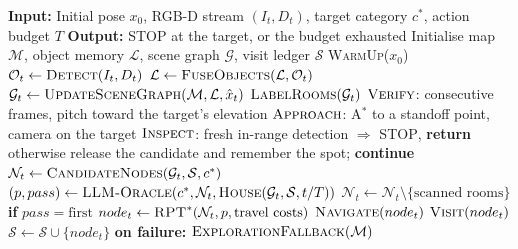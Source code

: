 \begin{algorithm}[htbp]
\caption{LLM-Guided Room Search with Target Closing}
\label{alg:exploration}
\begin{algorithmic}[1]
\STATE \textbf{Input:} Initial pose $x_0$, RGB-D stream $(I_t, D_t)$, target category $c^{*}$, action budget $T$
\STATE \textbf{Output:} \textsc{STOP} at the target, or the budget exhausted
\STATE Initialise map $\mathcal{M}$, object memory $\mathcal{L}$, scene graph $\mathcal{G}$, visit ledger $\mathcal{S}$
\STATE \textsc{WarmUp}($x_0$) 
    \STATE $\mathcal{O}_t \leftarrow \textsc{Detect}(I_t, D_t)$ 
    \STATE $\mathcal{L} \leftarrow \textsc{FuseObjects}(\mathcal{L}, \mathcal{O}_t)$ 
    \STATE $\mathcal{G}_t \leftarrow \textsc{UpdateSceneGraph}(\mathcal{M}, \mathcal{L}, \hat{x}_t)$ 
    \STATE $\textsc{LabelRooms}(\mathcal{G}_t)$ 
        \STATE $\textsc{Verify}$: consecutive frames, pitch toward the target's elevation
        \STATE $\textsc{Approach}$: A$^{*}$ to a standoff point, camera on the target
        \STATE $\textsc{Inspect}$: fresh in-range detection $\Rightarrow$ \textsc{STOP}, \textbf{return}
        \STATE otherwise release the candidate and remember the spot; \textbf{continue}
    \ENDIF
        \STATE $\mathcal{N}_t \leftarrow \textsc{CandidateNodes}(\mathcal{G}_t, \mathcal{S}, c^{*})$ 
        \STATE $(p, pass) \leftarrow \textsc{LLM-Oracle}(c^{*}, \mathcal{N}_t, \textsc{House}(\mathcal{G}_t, \mathcal{S}, t/T))$ 
        \STATE $\mathcal{N}_t \leftarrow \mathcal{N}_t \setminus \{\text{scanned rooms}\}$ \textbf{if} $pass = \text{first}$ 
        \STATE $node_t \leftarrow \textsc{RPT}^{*}(\mathcal{N}_t, p, \text{travel costs})$
    \ENDIF
    \STATE $\textsc{Navigate}(node_t)$
    \STATE $\textsc{Visit}(node_t)$ 
    \STATE $\mathcal{S} \leftarrow \mathcal{S} \cup \{node_t\}$
    \STATE \textbf{on failure:} $\textsc{ExplorationFallback}(\mathcal{M})$ 
\ENDWHILE
\end{algorithmic}
\end{algorithm}
